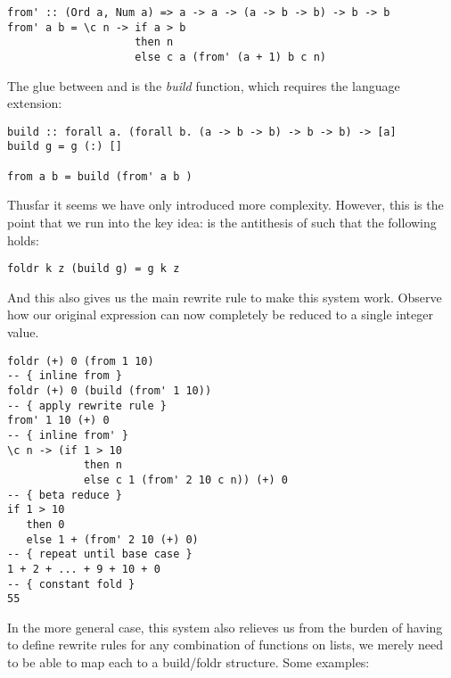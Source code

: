 \begin{listing}[H]
\begin{verbatim}
from' :: (Ord a, Num a) => a -> a -> (a -> b -> b) -> b -> b
from' a b = \c n -> if a > b
                    then n
                    else c a (from' (a + 1) b c n)
\end{verbatim}
\end{listing}

The glue between  and  is the \textit{build} function, which requires the  language extension:

\begin{listing}[H]
\begin{verbatim}
build :: forall a. (forall b. (a -> b -> b) -> b -> b) -> [a]
build g = g (:) []

from a b = build (from' a b )
\end{verbatim}
\end{listing}

Thusfar it seems we have only introduced more complexity. However, this is the point that we run into the key idea:
 is the antithesis of  such that the following holds:

\begin{listing}[H]
\begin{verbatim}
foldr k z (build g) = g k z
\end{verbatim}
\end{listing}

And this also gives us the main rewrite rule to make this system work. Observe how our original expression
can now completely be reduced to a single integer value.

\begin{listing}[H]
\begin{verbatim}
foldr (+) 0 (from 1 10)
-- { inline from }
foldr (+) 0 (build (from' 1 10))
-- { apply rewrite rule }
from' 1 10 (+) 0
-- { inline from' }
\c n -> (if 1 > 10
            then n
            else c 1 (from' 2 10 c n)) (+) 0
-- { beta reduce }
if 1 > 10
   then 0
   else 1 + (from' 2 10 (+) 0)
-- { repeat until base case }
1 + 2 + ... + 9 + 10 + 0
-- { constant fold }
55
\end{verbatim}
\end{listing}

In the more general case, this system also relieves us from the burden of having to
define rewrite rules for any combination of functions on lists, we merely need to be able to map each to a
build/foldr structure. Some examples:

